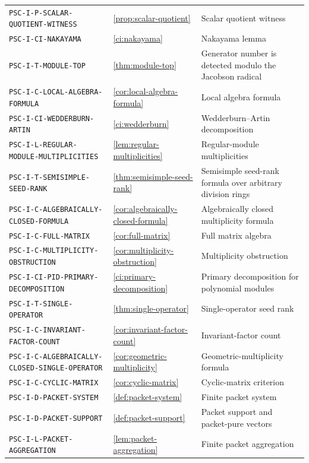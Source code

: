 \documentclass[11pt]{article}
\theoremstyle{definition}
\theoremstyle{remark}
\theoremstyle{definition}\newtheorem{example}[theorem]{Example}
\begin{document}
\begin{longtable}{@{}p{}p{}p{}@{}}
\nolinkurl{PSC-I-P-SCALAR-QUOTIENT-WITNESS} & \ref{prop:scalar-quotient} & Scalar quotient witness \\
\nolinkurl{PSC-I-CI-NAKAYAMA} & \ref{ci:nakayama} & Nakayama lemma \\
\nolinkurl{PSC-I-T-MODULE-TOP} & \ref{thm:module-top} & Generator number is detected modulo the Jacobson radical \\
\nolinkurl{PSC-I-C-LOCAL-ALGEBRA-FORMULA} & \ref{cor:local-algebra-formula} & Local algebra formula \\
\nolinkurl{PSC-I-CI-WEDDERBURN-ARTIN} & \ref{ci:wedderburn} & Wedderburn--Artin decomposition \\
\nolinkurl{PSC-I-L-REGULAR-MODULE-MULTIPLICITIES} & \ref{lem:regular-multiplicities} & Regular-module multiplicities \\
\nolinkurl{PSC-I-T-SEMISIMPLE-SEED-RANK} & \ref{thm:semisimple-seed-rank} & Semisimple seed-rank formula over arbitrary division rings \\
\nolinkurl{PSC-I-C-ALGEBRAICALLY-CLOSED-FORMULA} & \ref{cor:algebraically-closed-formula} & Algebraically closed multiplicity formula \\
\nolinkurl{PSC-I-C-FULL-MATRIX} & \ref{cor:full-matrix} & Full matrix algebra \\
\nolinkurl{PSC-I-C-MULTIPLICITY-OBSTRUCTION} & \ref{cor:multiplicity-obstruction} & Multiplicity obstruction \\
\nolinkurl{PSC-I-CI-PID-PRIMARY-DECOMPOSITION} & \ref{ci:primary-decomposition} & Primary decomposition for polynomial modules \\
\nolinkurl{PSC-I-T-SINGLE-OPERATOR} & \ref{thm:single-operator} & Single-operator seed rank \\
\nolinkurl{PSC-I-C-INVARIANT-FACTOR-COUNT} & \ref{cor:invariant-factor-count} & Invariant-factor count \\
\nolinkurl{PSC-I-C-ALGEBRAICALLY-CLOSED-SINGLE-OPERATOR} & \ref{cor:geometric-multiplicity} & Geometric-multiplicity formula \\
\nolinkurl{PSC-I-C-CYCLIC-MATRIX} & \ref{cor:cyclic-matrix} & Cyclic-matrix criterion \\
\nolinkurl{PSC-I-D-PACKET-SYSTEM} & \ref{def:packet-system} & Finite packet system \\
\nolinkurl{PSC-I-D-PACKET-SUPPORT} & \ref{def:packet-support} & Packet support and packet-pure vectors \\
\nolinkurl{PSC-I-L-PACKET-AGGREGATION} & \ref{lem:packet-aggregation} & Finite packet aggregation \\

\end{longtable}
\end{document}

